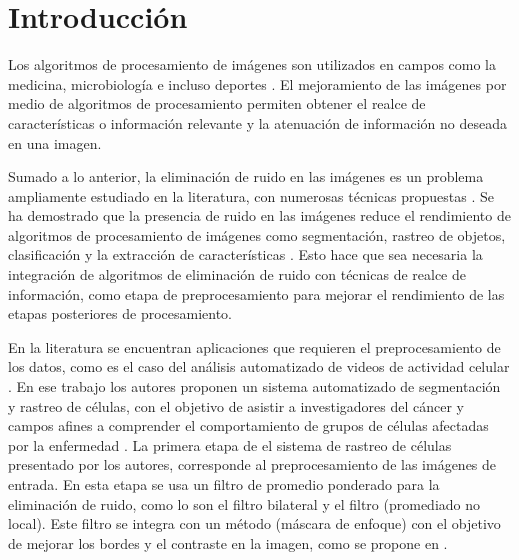 
\chapter{Introducción}
\label{chp:intro}

Los algoritmos de procesamiento de im\'agenes son utilizados en campos como la medicina, microbiolog\'ia e incluso deportes \cite{Aggarwal2011,	Ekin2003, Fils_BfilCells_2008}. El mejoramiento de las im\'agenes por medio de algoritmos de procesamiento permiten obtener el realce de caracter\'isticas o informaci\'on relevante y la atenuaci\'on de informaci\'on no deseada en una imagen. 

Sumado a lo anterior, la eliminaci\'on de ruido en las im\'agenes es un problema ampliamente estudiado en la literatura, con numerosas t\'ecnicas propuestas \cite{edgpreservefilter}. Se ha demostrado que la presencia de ruido en las im\'agenes reduce el rendimiento de algoritmos de procesamiento de im\'agenes como segmentaci\'on, rastreo de objetos, clasificaci\'on y la extracci\'on de caracter\'isticas \cite{BF2014,IMPROVESEGMENTATIONBF,CONCAPAN2016}. Esto hace que sea necesaria la integraci\'on de algoritmos de eliminaci\'on de ruido con t\'ecnicas de realce de informaci\'on, como etapa de preprocesamiento para mejorar el rendimiento de las etapas posteriores de procesamiento.  

En la literatura se encuentran aplicaciones que requieren el preprocesamiento de los datos, como es el caso del an\'alisis automatizado de videos de actividad celular \cite{saenz2015deceived}. En ese trabajo los autores proponen un sistema automatizado de segmentaci\'on y rastreo de c\'elulas, con el objetivo de asistir a investigadores del c\'ancer y campos afines a comprender el comportamiento de grupos de c\'elulas afectadas por la enfermedad \cite{saenz2015deceived}. La primera etapa de el sistema de rastreo de c\'elulas presentado por los autores, corresponde al preprocesamiento de las im\'agenes de entrada. En esta etapa se usa un filtro de promedio ponderado para la eliminaci\'on de ruido, como lo son el filtro bilateral y el filtro  (promediado no local). Este filtro se integra con un m\'etodo  (m\'ascara de enfoque) con el objetivo de mejorar los bordes y el contraste en la imagen, como se propone en \cite{calderon2015dewaff}. 

